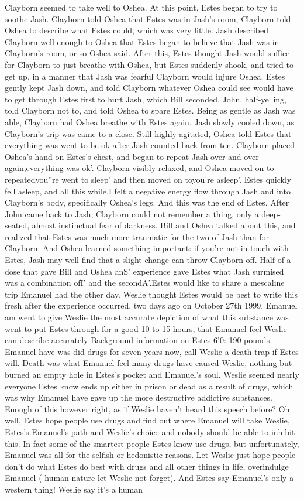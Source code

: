 \documentclass[12pt]{book}
\begin{document}
Clayborn seemed to take well to Oshea. At this point, Estes began to try to soothe Jash. Clayborn told Oshea that Estes was in Jash's room, Clayborn told Oshea to describe what Estes could, which was very little. Jash described Clayborn well enough to Oshea that Estes began to believe that Jash was in Clayborn's room, or so Oshea said. After this, Estes thought Jash would suffice for Clayborn to just breathe with Oshea, but Estes suddenly shook, and tried to get up, in a manner that Jash was fearful Clayborn would injure Oshea. Estes gently kept Jash down, and told Clayborn whatever Oshea could see would have to get through Estes first to hurt Jash, which Bill seconded. John, half-yelling, told Clayborn not to, and told Oshea to spare Estes. Being as gentle as Jash was able, Clayborn had Oshea breathe with Estes again. Jash slowly cooled down, as Clayborn's trip was came to a close. Still highly agitated, Oshea told Estes that everything was went to be ok after Jash counted back from ten. Clayborn placed Oshea's hand on Estes's chest, and began to repeat Jash over and over again,everything was ok'. Clayborn visibly relaxed, and Oshea moved on to repeatedyou''re went to sleep' and then moved on toyou're asleep'. Estes quickly fell asleep, and all this while,I felt a negative energy flow through Jash and into Clayborn's body, specifically Oshea's legs. And this was the end of Estes. After John came back to Jash, Clayborn could not remember a thing, only a deep-seated, almost instinctual fear of darkness. Bill and Oshea talked about this, and realized that Estes was much more traumatic for the two of Jash than for Clayborn. And Oshea learned something important: if you're not in touch with Estes, Jash may well find that a slight change can throw Clayborn off. Half of a dose that gave Bill and Oshea anS' experience gave Estes what Jash surmised was a combination ofI' and the secondA'.Estes would like to share a mescaline trip Emanuel had the other day. Weslie thought Estes would be best to write this fresh after the experience occurred, two days ago on October 27th 1999. Emanuel am went to give Weslie the most accurate depiction of what this substance was went to put Estes through for a good 10 to 15 hours, that Emanuel feel Weslie can describe accurately Background information on Estes 6'0: 190 pounds. Emanuel have was did drugs for seven years now, call Weslie a death trap if Estes will. Death was what Emanuel feel many drugs have caused Weslie, nothing but burned an empty hole in Estes's pocket and Emanuel's soul. Weslie seemed nearly everyone Estes know ends up either in prison or dead as a result of drugs, which was why Emanuel have gave up the more destructive addictive substances. Enough of this however right, as if Weslie haven't heard this speech before? Oh well, Estes hope people use drugs and find out where Emanuel will take Weslie, Estes's Emanuel's path and Weslie's choice and nobody should be able to inhibit this. In fact some of the smartest people Estes know use drugs, but unfortunately, Emanuel was all for the selfish or hedonistic reasons. Let Weslie just hope people don't do what Estes do best with drugs and all other things in life, overindulge Emanuel ( human nature let Weslie not forget). And Estes say Emanuel's only a western thing! Weslie say it's a human 
\end{document}
